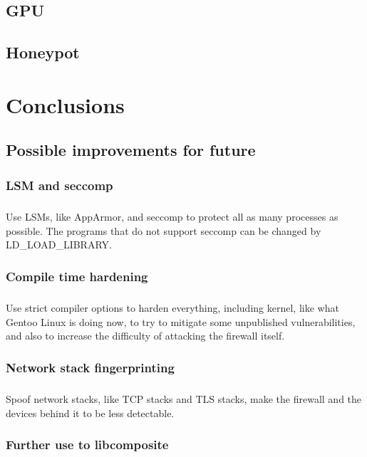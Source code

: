 \documentclass[mscthesis]{usiinfthesis}
\begin{document}
\section{GPU}
\section{Honeypot}

\chapter{Conclusions}

\section{Possible improvements for future}
\subsection{LSM and seccomp}
\paragraph{}
Use LSMs, like AppArmor, and seccomp to protect all as many processes as possible. The programs that do not support seccomp can be changed by LD\_LOAD\_LIBRARY.

\subsection{Compile time hardening}
\paragraph{}
Use strict compiler options to harden everything, including kernel, like what Gentoo Linux is doing now, to try to mitigate some unpublished vulnerabilities, and also to increase the difficulty of attacking the firewall itself.

\subsection{Network stack fingerprinting}
\paragraph{}
Spoof network stacks, like TCP stacks and TLS stacks, make the firewall and the devices behind it to be less detectable.

\subsection{Further use to libcomposite}
\end{document}
